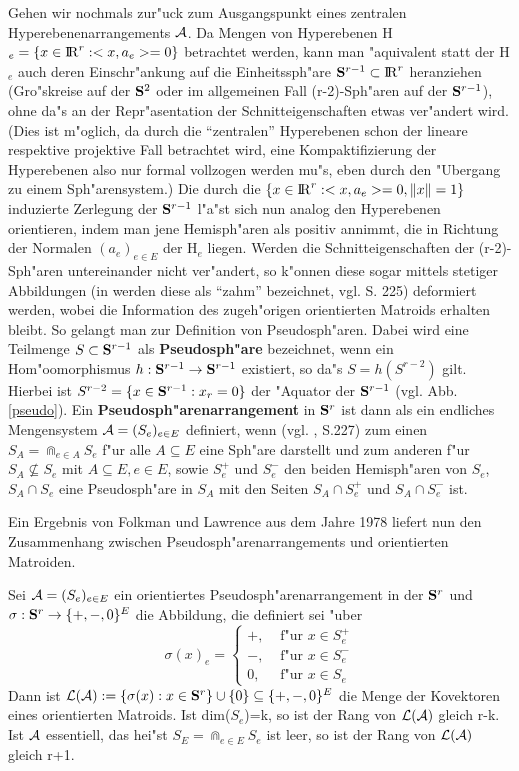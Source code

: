 Gehen wir nochmals zur"uck zum Ausgangspunkt eines zentralen
Hyperebenenarrangements $\cal A$. Da Mengen von Hyperebenen
H$_e=\{x\in\R^r:<x,a_e>=0\}$ betrachtet werden, kann man "aquivalent statt der
H$_e$ auch deren Einschr"ankung auf die Einheitssph"are $\S^{r-1}\subset\R^r$
heranziehen (Gro"skreise auf der $\S^2$ oder im allgemeinen Fall (r-2)-Sph"aren
auf der $\S^{r-1}$), ohne da"s an der Repr"asentation der Schnitteigenschaften
etwas ver"andert wird. (Dies ist m"oglich, da durch die "`zentralen"'
Hyperebenen schon der lineare respektive projektive Fall betrachtet wird,
eine Kompaktifizierung der Hyperebenen also nur formal vollzogen werden mu"s,
eben durch den "Ubergang zu einem Sph"arensystem.)
Die durch die $\{x\in\R^r:<x,a_e>=0,\|x\|=1\}$ induzierte Zerlegung der
$\S^{r-1}$ l"a"st sich nun analog den Hyperebenen orientieren, indem man jene
Hemisph"aren als positiv annimmt, die in Richtung der Normalen $(a_e)_{e\in E}$
der H$_e$ liegen. Werden die Schnitteigenschaften der (r-2)-Sph"aren
untereinander nicht ver"andert, so k"onnen diese sogar mittels stetiger
Abbildungen (in \cite{Bj:93} werden diese als "`zahm"' bezeichnet, vgl. S. 225)
deformiert werden, wobei die Information des zugeh"origen orientierten Matroids
erhalten bleibt. So gelangt man zur Definition von Pseudosph"aren. Dabei wird
eine Teilmenge $S\subset\S^{r-1}$ als {\bf Pseudosph"are}
bezeichnet, wenn ein Hom"oomorphismus $h:\S^{r-1}\to\S^{r-1}$ existiert, so
da"s $S=h(S^{r-2})$ gilt. Hierbei ist $S^{r-2}=\{x\in\S^{r-1}:x_r=0\}$ der
"Aquator der $\S^{r-1}$ (vgl. Abb.\ref{pseudo}). Ein {\bf
Pseudosph"arenarrangement} in $\S^r$ ist dann als ein endliches Mengensystem
${\cal A}=(S_e)_{e\in E}$ definiert, wenn (vgl. \cite{Bj:93}, S.227) zum einen
$S_A=\Cap_{e\in A} S_e$ f"ur alle $A\subseteq E$ eine Sph"are darstellt und zum
anderen f"ur $S_A\not\subseteq S_e$ mit $A\subseteq E,e\in E$, sowie $S^+_e$ und
$S^-_e$ den beiden Hemisph"aren von $S_e$, $S_A\cap S_e$ eine Pseudosph"are in
$S_A$ mit den Seiten $S_A\cap S^+_e$ und $S_A\cap S^-_e$ ist.

Ein Ergebnis von Folkman und Lawrence aus dem Jahre 1978 liefert nun den
Zusammenhang zwischen Pseudosph"arenarrangements und orientierten Matroiden.
\begin{satz}
Sei ${\cal A}=(S_e)_{e\in E}$ ein orientiertes Pseudosph"arenarrangement in
der $\S^r$ und $\sigma:\S^r\to\{+,-,0\}^E$ die Abbildung, die definiert
sei "uber
$$\sigma(x)_e=\left\{\begin{array}{ll}
                        +, & \mbox{ f"ur } x\in S^+_e\\
                        -, & \mbox{ f"ur } x\in S^-_e\\
                        0, & \mbox{ f"ur } x\in S_e\end{array}\right.$$
Dann ist ${\cal L(A)} := \{\sigma(x):x\in\S^r\}\cup\{0\}\subseteq\{+,-,0\}^E$
die Menge der Kovektoren eines orientierten Matroids. Ist dim($S_e$)=k, so
ist der Rang von $\cal L(A)$ gleich r-k. Ist $\cal A$ essentiell, das hei"st
$S_E=\Cap_{e\in E} S_e$ ist leer, so ist der Rang von $\cal L(A)$ gleich r+1.
\end{satz}

